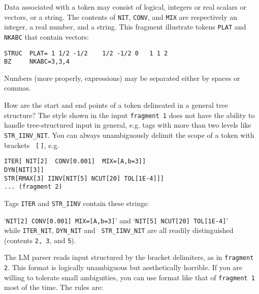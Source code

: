 \documentclass{article}
\begin{document}
\vskip 6pt\noindent Data associated with a token may consist of logical, integers or
real scalars or vectors, or a string. The contents of {\tt{}NIT},
{\tt{}CONV}, and {\tt{}MIX} are respectively an integer, a real number, and
a string.  This fragment illustrate tokens {\tt{}PLAT} and {\tt{}NKABC} that
contain vectors:
\begin{verbatim}
STRUC  PLAT= 1 1/2 -1/2    1/2 -1/2 0   1 1 2
BZ     NKABC=3,3,4
\end{verbatim}
Numbers (more properly, expressions) may be separated either by spaces or
commas.

\vskip 6pt\noindent How are the start and end points of a token delineated
in a general tree structure?  The style shown in the input {\tt{}fragment 1} does
not have the ability to handle tree-structured input in general, e.g.
tags with more than two levels like {\tt STR\_IINV\_NIT}.  You can
always unambiguously delimit the scope of a token with brackets {\tt
[$\,$]}, e.g.
\begin{verbatim}
ITER[ NIT[2]  CONV[0.001]  MIX=[A,b=3]]
DYN[NIT[3]]
STR[RMAX[3] IINV[NIT[5] NCUT[20] TOL[1E-4]]]
... (fragment 2)
\end{verbatim}
Tags {\tt ITER} and {\tt STR\_IINV} contain these strings:

`{\tt NIT[2]  CONV[0.001]  MIX=[A,b=3]}' \quad and \quad `{\tt NIT[5] NCUT[20] TOL[1E-4]}'\\
while {\tt ITER\_NIT}, {\tt DYN\_NIT} and {\tt
STR\_IINV\_NIT} are all readily distinguished (contents {\tt 2, 3}, and
{\tt 5}).

%

\vskip 6pt\noindent
The LM parser reads input structured by the bracket delimiters, as in
{\tt{}fragment 2}.  This format is logically unambiguous but aesthetically horrible.
If you are willing to tolerate small ambiguities, you can use format like
that of {\tt fragment 1} most of the time.  The rules are:
\end{document}
